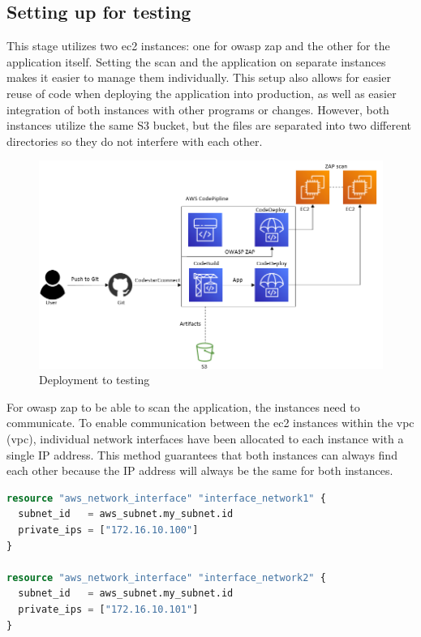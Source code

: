 \subsection{Setting up for testing}

This stage utilizes two \acrshort{ec2} instances: one for \acrshort{owasp} \acrshort{zap} and the other for the application itself. Setting the scan and the application on separate instances makes it easier to manage them individually. This setup also allows for easier reuse of code when deploying the application into production, as well as easier integration of both instances with other programs or changes. However, both instances utilize the same S3 bucket, but the files are separated into two different directories so they do not interfere with each other.

\vspace{2mm}
\begin{figure}[H]
    \centering
    \includegraphics[width=0.6\columnwidth]{Images/aws-piplin-5.png}
    \caption{Deployment to testing}
    \label{fig: Deployment to testing}
\end{figure}

For \acrshort{owasp} \acrshort{zap} to be able to scan the application, the instances need to communicate. To enable communication between the \acrshort{ec2} instances within the \acrlong{vpc} (\acrshort{vpc}), individual network interfaces have been allocated to each instance with a single IP address. This method guarantees that both instances can always find each other because the IP address will always be the same for both instances.
\\
\begin{lstlisting}[language=terraform, caption=Allocate IP adresses, captionpos=b, frame=single]
resource "aws_network_interface" "interface_network1" {
  subnet_id   = aws_subnet.my_subnet.id
  private_ips = ["172.16.10.100"]
}

resource "aws_network_interface" "interface_network2" {
  subnet_id   = aws_subnet.my_subnet.id
  private_ips = ["172.16.10.101"]
}
\end{lstlisting}

